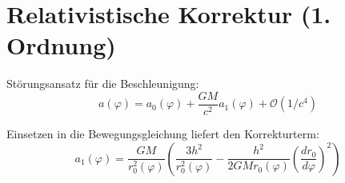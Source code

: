 \section{Relativistische Korrektur (1. Ordnung)}
Störungsansatz für die Beschleunigung:
\[ a(\varphi) = a_0(\varphi) + \frac{GM}{c^2} a_1(\varphi) + \mathcal{O}(1/c^4) \]

Einsetzen in die Bewegungsgleichung liefert den Korrekturterm:
\[ a_1(\varphi) = \frac{GM}{r_0^2(\varphi)} \left( \frac{3h^2}{r_0^2(\varphi)} - \frac{h^2}{2GM r_0(\varphi)} \left(\frac{dr_0}{d\varphi}\right)^2 \right) \]
